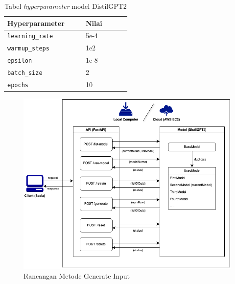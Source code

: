 \begin{itemize}[topsep=0pt]
  
  \begin{table}[H]
    \centering
    \caption{Tabel \emph{hyperparameter} model DistilGPT2}
    \begin{tabular}{|p{0.25\linewidth}|p{0.25\linewidth}|}
      \hline
      \textbf{Hyperparameter} & \textbf{Nilai} \\
      \hline
      \raggedright \texttt{learning\_rate} & 5e-4 \\
      \hline
      \raggedright \texttt{warmup\_steps} & 1e2 \\
      \hline
      \raggedright \texttt{epsilon} & 1e-8 \\
      \hline
      \raggedright \texttt{batch\_size} & 2 \\
      \hline
      \raggedright \texttt{epochs} & 10 \\
      \hline
    \end{tabular}
    
    \label{tab:hyperparameter}
  \end{table}


  \begin{figure}[H]
    \centering
    \includegraphics[scale=0.5]{gambar/RancanganMetodeGenerateInput.png}
  
    \caption{Rancangan Metode Generate Input}
    \label{fig:generateinput}

  \end{figure}
  

\end{itemize}
